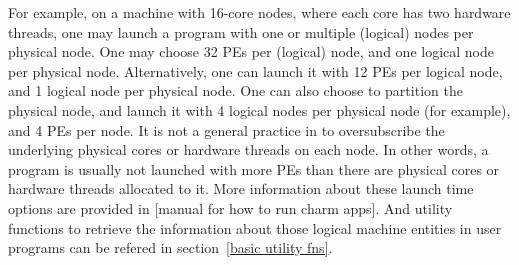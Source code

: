 For example, on a machine with 16-core nodes, where each core has two
hardware threads, one may launch a \charmpp{} program with one or multiple
(logical) nodes per physical node. One may choose 32 PEs per (logical) node,
and one logical node per physical node. Alternatively, one can launch
it with 12 PEs per logical node, and 1 logical node per physical
node. One can also choose to partition the physical node, and launch
it with 4 logical nodes per physical node (for example), and 4 PEs per
node. It is not a general practice in \charmpp{} to oversubscribe the underlying
physical cores or hardware threads on each node. In other words, a
\charmpp{} program is usually not launched with more PEs than there
are physical cores or hardware threads allocated to it. More information about
these launch time options are provided in [manual for how to run charm
apps]. And utility functions to retrieve the information about those
\charmpp{} logical machine entities in user programs can be refered
in section~\ref{basic utility fns}.
